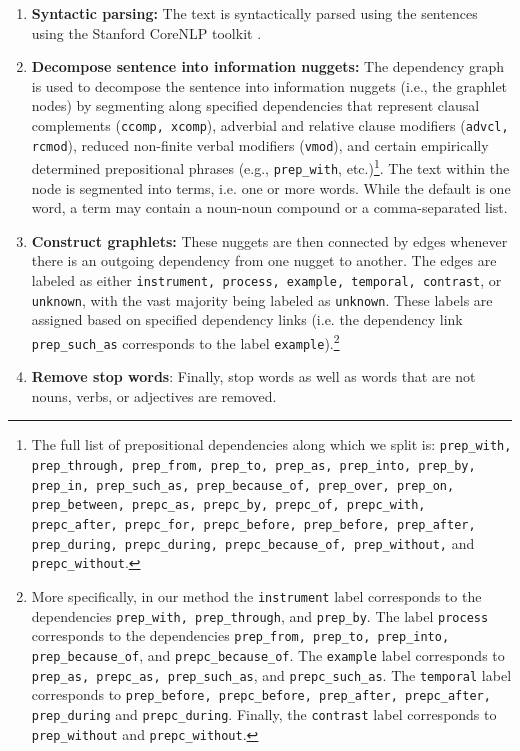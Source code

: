 \begin{enumerate}
\item \textbf{Syntactic parsing:} The text is syntactically parsed using the sentences using the Stanford CoreNLP toolkit \citep{manning2014stanford}.  

\item \textbf{Decompose sentence into information nuggets:} The dependency graph is used to decompose the sentence into information nuggets (i.e., the graphlet nodes) by segmenting along specified dependencies that represent clausal complements ({\tt ccomp, xcomp}), adverbial and relative clause modifiers ({\tt advcl, rcmod}), reduced non-finite verbal modifiers ({\tt vmod}), and certain empirically determined prepositional phrases (e.g., \texttt{prep\_with}, etc.)\footnote{The full list of prepositional dependencies along which we split is: {\tt prep\_with, prep\_through, prep\_from, prep\_to, prep\_as, prep\_into, prep\_by, prep\_in, prep\_such\_as, prep\_because\_of, prep\_over, prep\_on, prep\_between, prepc\_as, prepc\_by, prepc\_of, prepc\_with, prepc\_after, prepc\_for, prepc\_before, prep\_before, prep\_after, prep\_during, prepc\_during, prepc\_because\_of, prep\_without,} and {\tt prepc\_without}.}.  The text within the node is segmented into terms, i.e. one or more words.  While the default is one word, a term may contain a noun-noun compound or a comma-separated list.  

\item \textbf{Construct graphlets:} These nuggets are then connected by edges whenever there is an outgoing dependency from one nugget to another.  The edges are labeled as either \texttt{instrument, process, example, temporal, contrast}, or \texttt{unknown}, with the vast majority being labeled as \texttt{unknown}.  These labels are assigned based on specified dependency links (i.e. the dependency link \texttt{prep\_such\_as} corresponds to the label \texttt{example}).\footnote{More specifically, in our method the {\tt instrument} label corresponds to the dependencies {\tt prep\_with, prep\_through}, and {\tt prep\_by}.  The label {\tt process} corresponds to the dependencies {\tt prep\_from, prep\_to, prep\_into, prep\_because\_of}, and {\tt prepc\_because\_of}.  The {\tt example} label corresponds to {\tt prep\_as, prepc\_as, prep\_such\_as}, and {\tt prepc\_such\_as}.  The {\tt temporal} label corresponds to {\tt prep\_before, prepc\_before, prep\_after, prepc\_after, prep\_during} and {\tt prepc\_during}.  Finally, the {\tt contrast} label corresponds to {\tt prep\_without} and {\tt prepc\_without}.}

\item \textbf{Remove stop words}: Finally, stop words as well as words that are not nouns, verbs, or adjectives are removed.

\end{enumerate}



